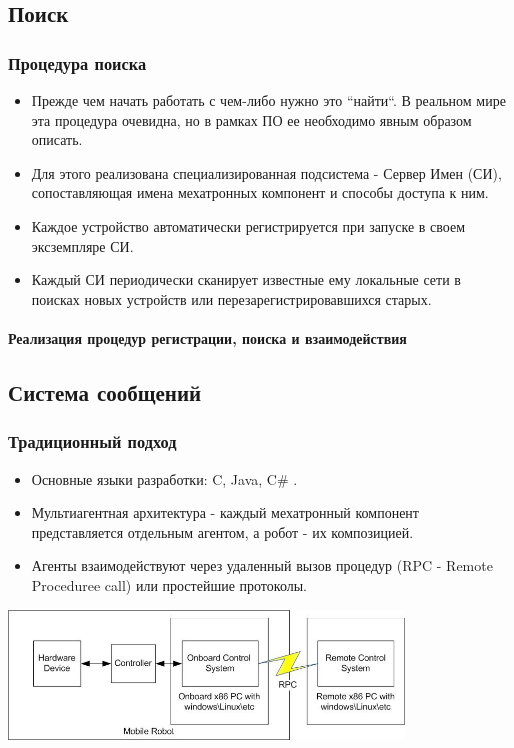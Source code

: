 \documentclass{beamer}
\begin{document}
\subsection{Поиск}
\begin{frame}
\frametitle{Процедура поиска}
\begin{itemize}
\item Прежде чем начать работать с чем-либо нужно это ``найти``. 
В реальном мире эта процедура очевидна, но в рамках ПО ее необходимо явным
образом описать.
\item Для этого реализована специализированная подсистема - Сервер Имен (СИ),
сопоставляющая имена мехатронных компонент и способы доступа к ним.
\item Каждое устройство автоматически регистрируется при запуске в своем
эксземпляре СИ.
\item Каждый СИ периодически сканирует известные ему локальные сети в
поисках новых устройств или перезарегистрировавшихся старых.
\end{itemize}
\end{frame}

\begin{frame}
\framesubtitle{Реализация процедур регистрации, поиска и взаимодействия}
\end{frame}

\subsection{Система сообщений}
\begin{frame}
\frametitle{Традиционный подход}
\begin{itemize}
	\item<1>Основные языки разработки: C, Java, C\# .
	\item<1>Мультиагентная архитектура - каждый мехатронный компонент
	представляется отдельным агентом, а робот - их композицией.
	\item<1>Агенты взаимодействуют через удаленный вызов процедур (RPC - Remote
	Proceduree call) или простейшие протоколы.
\end{itemize}
\includegraphics[width=10.5cm]{rpc0.jpg}
\end{frame}
\end{document}
